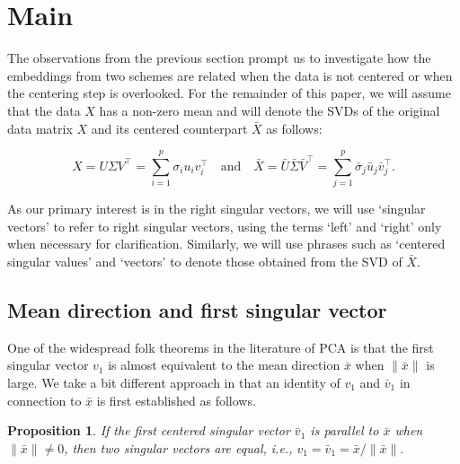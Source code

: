 \documentclass[11pt]{article}
\newtheorem{proposition}[theorem]{Proposition}
\begin{document}
\section{Main}\label{sec:main}



The observations from the previous section prompt us to investigate how the embeddings from two schemes are related when the data is not centered or when the centering step is overlooked. For the remainder of this paper, we will assume that the data $X$ has a non-zero mean and will denote the SVDs of the original data matrix $X$ and its centered counterpart $\bar{X}$ as follows:


\begin{equation*}
	X = U\Sigma V^\top = \sum_{i=1}^{p} \sigma_i u_i v_i^\top\quad\text{and}\quad \bar{X} = \bar{U} \bar{\Sigma} \bar{V}^\top = \sum_{j=1}^p \bar{\sigma}_j \bar{u}_j \bar{v}_j^\top.
\end{equation*}


As our primary interest is in the right singular vectors, we will use `singular vectors' to refer to right singular vectors, using the terms `left' and `right' only when necessary for clarification. Similarly, we will use phrases such as `centered singular values' and `vectors' to denote those obtained from the SVD of $\bar{X}$.




\subsection{Mean direction and first singular vector}

One of the widespread folk theorems in the literature of PCA is that the first singular vector $v_1$ is almost equivalent to the mean direction $\bar{x}$ when $\| \bar{x} \|$ is large. We take a bit different approach in that an identity of $v_1$ and $\bar{v}_1$ in connection to $\bar{x}$ is first established as follows. 

\vspace{0.25cm}
\begin{tcolorbox}[colback=GreenYellow]
\begin{proposition}\label{theory:parallel}
	If the first centered singular vector $\bar{v}_1$ is parallel to $\bar{x}$ when $\|\bar{x}\|\neq 0$, then two singular vectors are equal, i.e., $v_1 = \bar{v}_1 = \bar{x}/\|\bar{x}\|.$
\end{proposition}
\end{tcolorbox}
\vspace{0.25cm}
\end{document}
